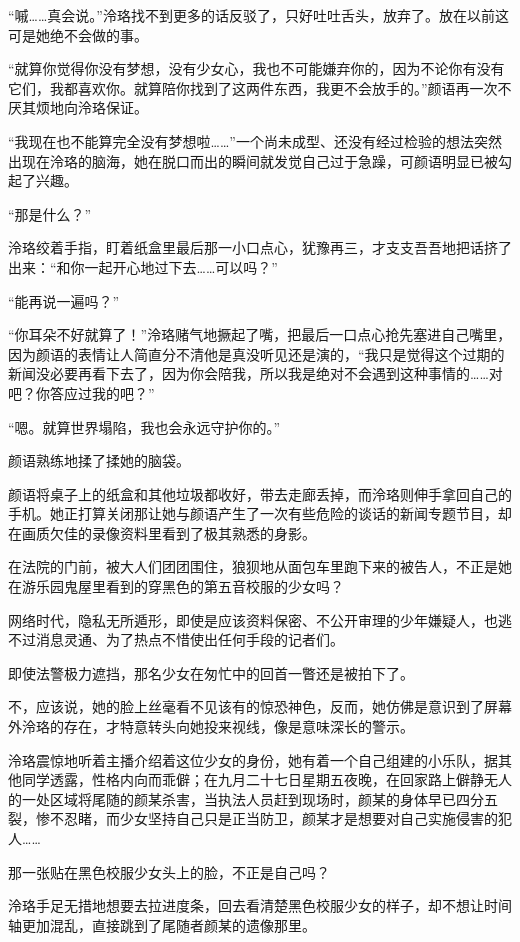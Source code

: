 \documentclass[UTF8, scheme = chinese, openany]{ctexbook}
\begin{document}
“嘁……真会说。”泠珞找不到更多的话反驳了，只好吐吐舌头，放弃了。放在以前这可是她绝不会做的事。

“就算你觉得你没有梦想，没有少女心，我也不可能嫌弃你的，因为不论你有没有它们，我都喜欢你。就算陪你找到了这两件东西，我更不会放手的。”颜语再一次不厌其烦地向泠珞保证。

“我现在也不能算完全没有梦想啦……”一个尚未成型、还没有经过检验的想法突然出现在泠珞的脑海，她在脱口而出的瞬间就发觉自己过于急躁，可颜语明显已被勾起了兴趣。

“那是什么？”

泠珞绞着手指，盯着纸盒里最后那一小口点心，犹豫再三，才支支吾吾地把话挤了出来：“和你一起开心地过下去……可以吗？”

“能再说一遍吗？”

“你耳朵不好就算了！”泠珞赌气地撅起了嘴，把最后一口点心抢先塞进自己嘴里，因为颜语的表情让人简直分不清他是真没听见还是演的，“我只是觉得这个过期的新闻没必要再看下去了，因为你会陪我，所以我是绝对不会遇到这种事情的……对吧？你答应过我的吧？”

“嗯。就算世界塌陷，我也会永远守护你的。”

颜语熟练地揉了揉她的脑袋。

颜语将桌子上的纸盒和其他垃圾都收好，带去走廊丢掉，而泠珞则伸手拿回自己的手机。她正打算关闭那让她与颜语产生了一次有些危险的谈话的新闻专题节目，却在画质欠佳的录像资料里看到了极其熟悉的身影。

在法院的门前，被大人们团团围住，狼狈地从面包车里跑下来的被告人，不正是她在游乐园鬼屋里看到的穿黑色的第五音校服的少女吗？

网络时代，隐私无所遁形，即使是应该资料保密、不公开审理的少年嫌疑人，也逃不过消息灵通、为了热点不惜使出任何手段的记者们。

即使法警极力遮挡，那名少女在匆忙中的回首一瞥还是被拍下了。

不，应该说，她的脸上丝毫看不见该有的惊恐神色，反而，她仿佛是意识到了屏幕外泠珞的存在，才特意转头向她投来视线，像是意味深长的警示。

泠珞震惊地听着主播介绍着这位少女的身份，她有着一个自己组建的小乐队，据其他同学透露，性格内向而乖僻；在九月二十七日星期五夜晚，在回家路上僻静无人的一处区域将尾随的颜某杀害，当执法人员赶到现场时，颜某的身体早已四分五裂，惨不忍睹，而少女坚持自己只是正当防卫，颜某才是想要对自己实施侵害的犯人……

那一张贴在黑色校服少女头上的脸，不正是自己吗？

泠珞手足无措地想要去拉进度条，回去看清楚黑色校服少女的样子，却不想让时间轴更加混乱，直接跳到了尾随者颜某的遗像那里。
\end{document}
